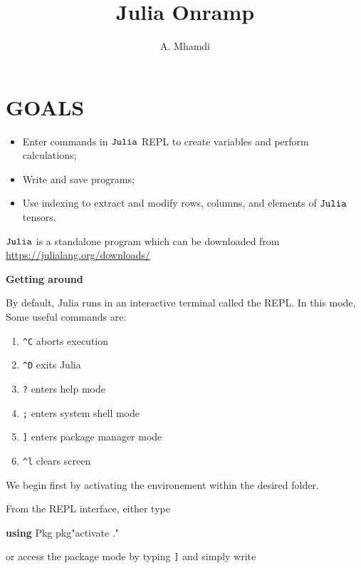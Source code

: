 \documentclass[11pt]{article}
\title{Julia Onramp}
\author{A. Mhamdi}
\providecommand{\tightlist}{%
      \setlength{\itemsep}{0pt}\setlength{\parskip}{0pt}}
\newenvironment{Shaded}{}{}
\newcommand{\KeywordTok}[1]{\textcolor[rgb]{0.00,0.44,0.13}{\textbf{{#1}}}}
\newcommand{\StringTok}[1]{\textcolor[rgb]{0.25,0.44,0.63}{{#1}}}
\newcommand{\NormalTok}[1]{{#1}}
\begin{document}
    
    \maketitle
    
    

  

    \hypertarget{goals}{%
\section{GOALS}\label{goals}}

\begin{itemize}
\tightlist
\item
  Enter commands in \({\tt Julia}\) REPL to create variables and perform
  calculations;
\item
  Write and save programs;
\item
  Use indexing to extract and modify rows, columns, and elements of
  \({\tt Julia}\) tensors.
\end{itemize}

    \({\tt Julia}\) is a standalone program which can be downloaded from
\url{https://julialang.org/downloads/}

    \textbf{Getting around}

    By default, Julia runs in an interactive terminal called the REPL. In
this mode, Some useful commands are: 
\begin{enumerate}
	\item \texttt{\^{}C} aborts execution
	\item \texttt{\^{}D} exits Julia
	\item \texttt{?} enters help mode
	\item \texttt{;} enters system shell mode
	\item \texttt{{]}} enters package manager mode
	\item \texttt{\^{}l} clears screen
\end{enumerate}

    We begin first by activating the environement within the desired folder.

    From the REPL interface, either type

\begin{Shaded}
\begin{Highlighting}[]
\KeywordTok{using}\NormalTok{ Pkg  }
\NormalTok{pkg}\StringTok{"activate ."}
\end{Highlighting}
\end{Shaded}

or access the package mode by typing \texttt{{]}} and simply write
\end{document}
